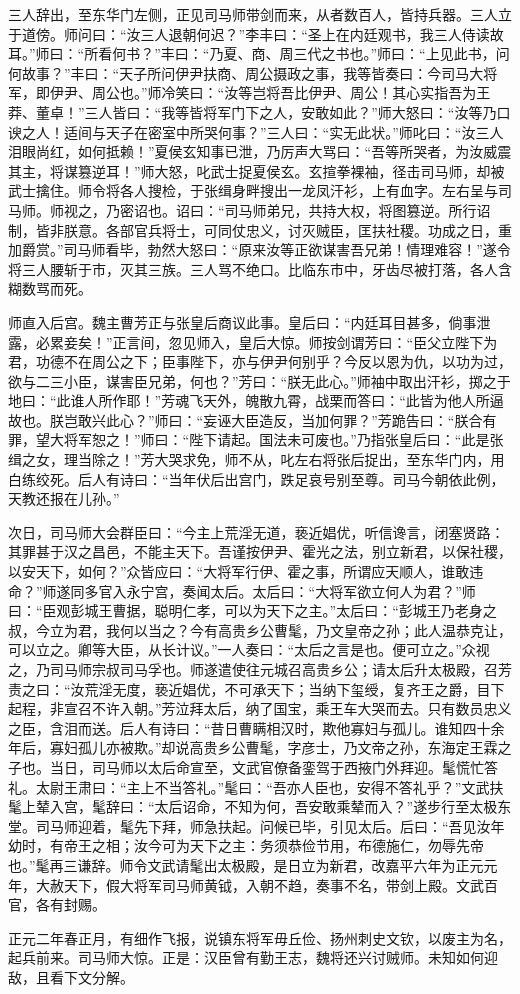 三人辞出，至东华门左侧，正见司马师带剑而来，从者数百人，皆持兵器。三人立于道傍。师问曰：“汝三人退朝何迟？”李丰曰：“圣上在内廷观书，我三人侍读故耳。”师曰：“所看何书？”丰曰：“乃夏、商、周三代之书也。”师曰：“上见此书，问何故事？”丰曰：“天子所问伊尹扶商、周公摄政之事，我等皆奏曰：今司马大将军，即伊尹、周公也。”师冷笑曰：“汝等岂将吾比伊尹、周公！其心实指吾为王莽、董卓！”三人皆曰：“我等皆将军门下之人，安敢如此？”师大怒曰：“汝等乃口谀之人！适间与天子在密室中所哭何事？”三人曰：“实无此状。”师叱曰：“汝三人泪眼尚红，如何抵赖！”夏侯玄知事已泄，乃厉声大骂曰：“吾等所哭者，为汝威震其主，将谋篡逆耳！”师大怒，叱武士捉夏侯玄。玄揎拳裸袖，径击司马师，却被武士擒住。师令将各人搜检，于张缉身畔搜出一龙凤汗衫，上有血字。左右呈与司马师。师视之，乃密诏也。诏曰：“司马师弟兄，共持大权，将图篡逆。所行诏制，皆非朕意。各部官兵将士，可同仗忠义，讨灭贼臣，匡扶社稷。功成之日，重加爵赏。”司马师看毕，勃然大怒曰：“原来汝等正欲谋害吾兄弟！情理难容！”遂令将三人腰斩于市，灭其三族。三人骂不绝口。比临东市中，牙齿尽被打落，各人含糊数骂而死。

师直入后宫。魏主曹芳正与张皇后商议此事。皇后曰：“内廷耳目甚多，倘事泄露，必累妾矣！”正言间，忽见师入，皇后大惊。师按剑谓芳曰：“臣父立陛下为君，功德不在周公之下；臣事陛下，亦与伊尹何别乎？今反以恩为仇，以功为过，欲与二三小臣，谋害臣兄弟，何也？”芳曰：“朕无此心。”师袖中取出汗衫，掷之于地曰：“此谁人所作耶！”芳魂飞天外，魄散九霄，战栗而答曰：“此皆为他人所逼故也。朕岂敢兴此心？”师曰：“妄诬大臣造反，当加何罪？”芳跪告曰：“朕合有罪，望大将军恕之！”师曰：“陛下请起。国法未可废也。”乃指张皇后曰：“此是张缉之女，理当除之！”芳大哭求免，师不从，叱左右将张后捉出，至东华门内，用白练绞死。后人有诗曰：“当年伏后出宫门，跌足哀号别至尊。司马今朝依此例，天教还报在儿孙。”

次日，司马师大会群臣曰：“今主上荒淫无道，亵近娼优，听信谗言，闭塞贤路：其罪甚于汉之昌邑，不能主天下。吾谨按伊尹、霍光之法，别立新君，以保社稷，以安天下，如何？”众皆应曰：“大将军行伊、霍之事，所谓应天顺人，谁敢违命？”师遂同多官入永宁宫，奏闻太后。太后曰：“大将军欲立何人为君？”师曰：“臣观彭城王曹据，聪明仁孝，可以为天下之主。”太后曰：“彭城王乃老身之叔，今立为君，我何以当之？今有高贵乡公曹髦，乃文皇帝之孙；此人温恭克让，可以立之。卿等大臣，从长计议。”一人奏曰：“太后之言是也。便可立之。”众视之，乃司马师宗叔司马孚也。师遂遣使往元城召高贵乡公；请太后升太极殿，召芳责之曰：“汝荒淫无度，亵近娼优，不可承天下；当纳下玺绶，复齐王之爵，目下起程，非宣召不许入朝。”芳泣拜太后，纳了国宝，乘王车大哭而去。只有数员忠义之臣，含泪而送。后人有诗曰：“昔日曹瞒相汉时，欺他寡妇与孤儿。谁知四十余年后，寡妇孤儿亦被欺。”却说高贵乡公曹髦，字彦士，乃文帝之孙，东海定王霖之子也。当日，司马师以太后命宣至，文武官僚备銮驾于西掖门外拜迎。髦慌忙答礼。太尉王肃曰：“主上不当答礼。”髦曰：“吾亦人臣也，安得不答礼乎？”文武扶髦上辇入宫，髦辞曰：“太后诏命，不知为何，吾安敢乘辇而入？”遂步行至太极东堂。司马师迎着，髦先下拜，师急扶起。问候已毕，引见太后。后曰：“吾见汝年幼时，有帝王之相；汝今可为天下之主：务须恭俭节用，布德施仁，勿辱先帝也。”髦再三谦辞。师令文武请髦出太极殿，是日立为新君，改嘉平六年为正元元年，大赦天下，假大将军司马师黄钺，入朝不趋，奏事不名，带剑上殿。文武百官，各有封赐。

正元二年春正月，有细作飞报，说镇东将军毋丘俭、扬州刺史文钦，以废主为名，起兵前来。司马师大惊。正是：汉臣曾有勤王志，魏将还兴讨贼师。未知如何迎敌，且看下文分解。